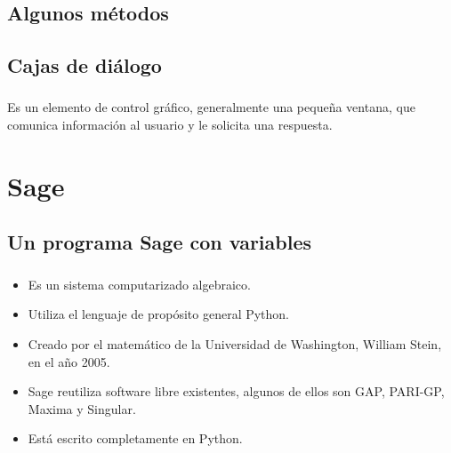 \subsection{Algunos métodos}

\begin{frame}
\frametitle{\insertsection}
\begin{block}{\insertsubsection}

\end{block}
\end{frame}

\subsection{Cajas de diálogo}

\begin{frame}
\frametitle{\insertsection}
\begin{block}{\insertsubsection}
Es un elemento de control gráfico, generalmente una pequeña ventana, que comunica información al usuario y le solicita una respuesta.
\end{block}
\end{frame}

\begin{frame}[fragile]
\frametitle{\insertsection}
\end{frame}

\section{Sage}
\subsection{Un programa Sage con variables}

\begin{frame}
\frametitle{\insertsection}
\begin{block}{\insertsubsection}
\begin{itemize}
\item Es un sistema computarizado algebraico.
\item Utiliza el lenguaje de propósito general Python.
\item Creado por el matemático de la Universidad de Washington, William Stein, en el año 2005.
\item Sage reutiliza software libre existentes, algunos de ellos son GAP, PARI-GP, Maxima y Singular.
\item Está escrito completamente en Python.
\end{itemize}
\end{block}
\end{frame}

